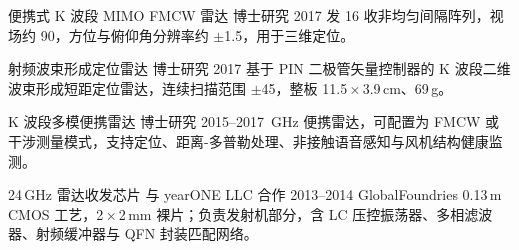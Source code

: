 %
%


\begin{cventries}

    \cventry
        {便携式 K 波段 MIMO FMCW 雷达}
        {博士研究}
        {}
        {2017}
        {{ 发 16 收非均匀间隔阵列，视场约 90\textdegree，方位与俯仰角分辨率约 $\pm$1.5\textdegree，用于三维定位。}}

    \cventry
        {射频波束形成定位雷达}
        {博士研究}
        {}
        {2017}
        {{\cvdescfont 基于 PIN 二极管矢量控制器的 K 波段二维波束形成短距定位雷达，连续扫描范围 $\pm$45\textdegree，整板 11.5\,$\times$\,3.9\,cm、69\,g。}}

    \cventry
        {K 波段多模便携雷达}
        {博士研究}
        {}
        {2015--2017}
        {{\,GHz 便携雷达，可配置为 FMCW 或干涉测量模式，支持定位、距离-多普勒处理、非接触语音感知与风机结构健康监测。}}

    \cventry
        {24\,GHz 雷达收发芯片}
        {与 yearONE LLC 合作}
        {}
        {2013--2014}
        {{\cvdescfont GlobalFoundries 0.13\,\textmu m CMOS 工艺，2\,$\times$\,2\,mm 裸片；负责发射机部分，含 LC 压控振荡器、多相滤波器、射频缓冲器与 QFN 封装匹配网络。}}

\end{cventries}
